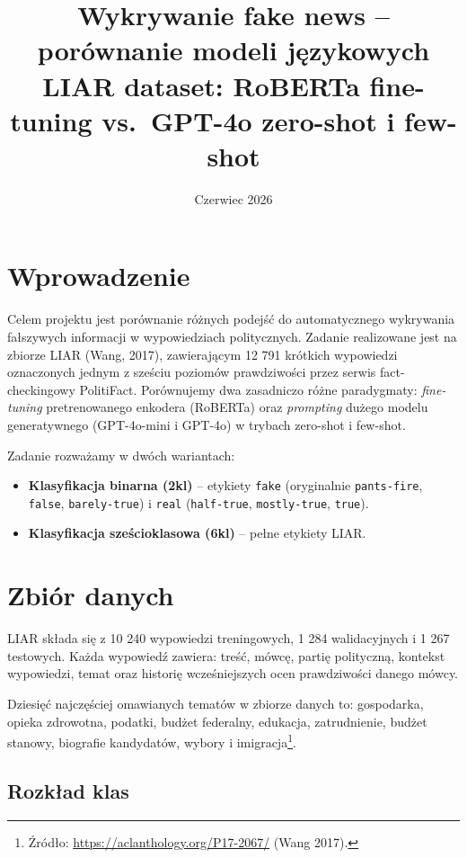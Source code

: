 \documentclass[11pt,a4paper]{article}
\title{Wykrywanie fake news -- porównanie modeli językowych\\
\large LIAR dataset: RoBERTa fine-tuning vs.\ GPT-4o zero-shot i few-shot}
\date{Czerwiec 2026}
\begin{document}
\maketitle

\section{Wprowadzenie}

Celem projektu jest porównanie różnych podejść do automatycznego wykrywania fałszywych
informacji w wypowiedziach politycznych. Zadanie realizowane jest na zbiorze LIAR
(Wang, 2017), zawierającym 12 791 krótkich wypowiedzi oznaczonych jednym z sześciu
poziomów prawdziwości przez serwis fact-checkingowy PolitiFact. Porównujemy dwa
zasadniczo różne paradygmaty: \emph{fine-tuning} pretrenowanego enkodera (RoBERTa)
oraz \emph{prompting} dużego modelu generatywnego (GPT-4o-mini i GPT-4o) w trybach
zero-shot i few-shot.

Zadanie rozważamy w dwóch wariantach:
\begin{itemize}
  \item \textbf{Klasyfikacja binarna (2kl)} -- etykiety \texttt{fake} (oryginalnie
        \texttt{pants-fire}, \texttt{false}, \texttt{barely-true}) i \texttt{real}
        (\texttt{half-true}, \texttt{mostly-true}, \texttt{true}).
  \item \textbf{Klasyfikacja sześcioklasowa (6kl)} -- pełne etykiety LIAR.
\end{itemize}

\section{Zbiór danych}

LIAR składa się z 10 240 wypowiedzi treningowych, 1 284 walidacyjnych i 1 267
testowych. Każda wypowiedź zawiera: treść, mówcę, partię polityczną, kontekst
wypowiedzi, temat oraz historię wcześniejszych ocen prawdziwości danego mówcy.

Dziesięć najczęściej omawianych tematów w zbiorze danych to: gospodarka,
opieka zdrowotna, podatki, budżet federalny, edukacja, zatrudnienie, budżet
stanowy, biografie kandydatów, wybory i imigracja\footnote{Źródło:
\url{https://aclanthology.org/P17-2067/} (Wang 2017).}.

\subsection{Rozkład klas}
\end{document}
